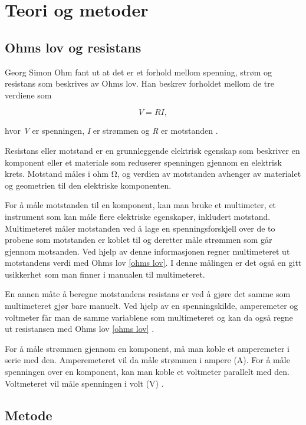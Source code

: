 \documentclass[twocolumn, a4paper, 11pt]{article} %
\begin{document}
\section{Teori og metoder}

\subsection{Ohms lov og resistans}
Georg Simon Ohm fant ut at det er et forhold mellom spenning, strøm og resistans som beskrives av Ohms lov. Han beskrev forholdet mellom de tre verdiene som

\begin{equation}
     V = R I ,
    \label{ohms lov}
\end{equation}

hvor \textit{V} er spenningen, \textit{I} er strømmen og \textit{R} er motstanden \cite{Ohms_lov}.

\bigskip 


Resistans eller motstand er en grunnleggende elektrisk egenskap som beskriver en komponent eller et materiale som reduserer spenningen gjennom en elektrisk krets. Motstand måles i ohm \textit{$\si{\ohm}$}, og verdien av motstanden avhenger av materialet og geometrien til den elektriske komponenten.

For å måle motstanden til en komponent, kan man bruke et multimeter, et instrument som kan måle flere elektriske egenskaper, inkludert motstand. Multimeteret måler motstanden ved å lage en spenningsforskjell over de to probene som motstanden er koblet til og deretter måle strømmen som går gjennom motsanden. Ved hjelp av denne informasjonen regner multimeteret ut motstandens verdi med Ohms lov \eqref{ohms lov}. I denne målingen er det også en gitt usikkerhet som man finner i manualen til multimeteret. 

En annen måte å beregne motstandens resistans er ved å gjøre det samme som multimeteret gjør bare manuelt. Ved hjelp av en spenningskilde, amperemeter og voltmeter får man de samme variablene som multimeteret og kan da også regne ut resistansen med Ohms lov \eqref{ohms lov} \cite{Elektrisk_strøm}.

For å måle strømmen gjennom en komponent, må man koble et amperemeter i serie med den. Amperemeteret vil da måle strømmen i ampere (A). For å måle spenningen over en komponent, kan man koble et voltmeter parallelt med den. Voltmeteret vil måle spenningen i volt (V) \cite{oppgavetekst}.


\subsection{Metode}
\end{document}
